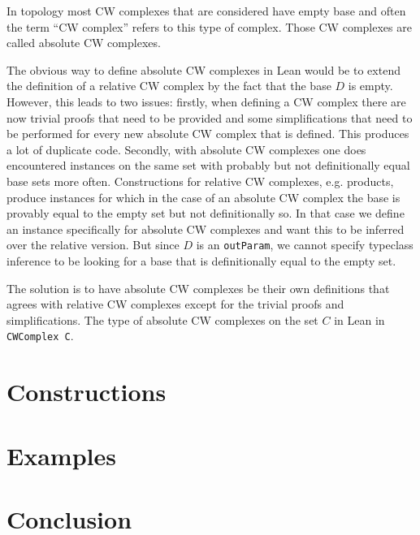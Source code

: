 In topology most CW complexes that are considered have empty base and often the term ``CW complex'' refers to this type of complex. 
Those CW complexes are called absolute CW complexes. 

The obvious way to define absolute CW complexes in Lean would be to extend the definition of a relative CW complex by the fact that the base $D$ is empty. 
However, this leads to two issues: 
firstly, when defining a CW complex there are now trivial proofs that need to be provided and some simplifications that need to be performed for every new absolute CW complex that is defined. 
This produces a lot of duplicate code. 
Secondly, with absolute CW complexes one does encountered instances on the same set with probably but not definitionally equal base sets more often. 
Constructions for relative CW complexes, e.g. products, produce instances for which in the case of an absolute CW complex the base is provably equal to the empty set but not definitionally so. 
In that case we define an instance specifically for absolute CW complexes and want this to be inferred over the relative version. 
But since $D$ is an \lstinline|outParam|, we cannot specify typeclass inference to be looking for a base that is definitionally equal to the empty set. 

The solution is to have absolute CW complexes be their own definitions that agrees with relative CW complexes except for the trivial proofs and simplifications. 
The type of absolute CW complexes on the set $C$ in Lean in \lstinline|CWComplex C|. 





\section{Constructions}


\section{Examples}

\section{Conclusion}

